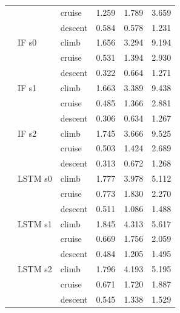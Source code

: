 \begin{footnotesize}
\begin{longtable}{lllrrr}
 &  & cruise & 1.259 & 1.789 & 3.659 \\
 &  & descent & 0.584 & 0.578 & 1.231 \\
 & IF s0 & climb & 1.656 & 3.294 & 9.194 \\
 &  & cruise & 0.531 & 1.394 & 2.930 \\
 &  & descent & 0.322 & 0.664 & 1.271 \\
 & IF s1 & climb & 1.663 & 3.389 & 9.438 \\
 &  & cruise & 0.485 & 1.366 & 2.881 \\
 &  & descent & 0.306 & 0.634 & 1.267 \\
 & IF s2 & climb & 1.745 & 3.666 & 9.525 \\
 &  & cruise & 0.503 & 1.424 & 2.689 \\
 &  & descent & 0.313 & 0.672 & 1.268 \\
 & LSTM s0 & climb & 1.777 & 3.978 & 5.112 \\
 &  & cruise & 0.773 & 1.830 & 2.270 \\
 &  & descent & 0.511 & 1.086 & 1.488 \\
 & LSTM s1 & climb & 1.845 & 4.313 & 5.617 \\
 &  & cruise & 0.669 & 1.756 & 2.059 \\
 &  & descent & 0.484 & 1.205 & 1.495 \\
 & LSTM s2 & climb & 1.796 & 4.193 & 5.195 \\
 &  & cruise & 0.671 & 1.720 & 1.887 \\
 &  & descent & 0.545 & 1.338 & 1.529 \\
\end{longtable}
\end{footnotesize}
